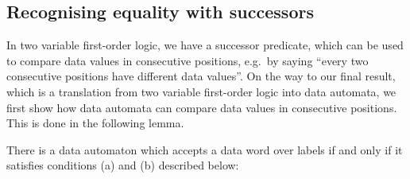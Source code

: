 \subsection*{Recognising equality with successors}
In two variable first-order logic, we have a successor predicate, which can be used to compare data values in consecutive positions, e.g.~by saying ``every two consecutive positions have different data values''. On the way to our final result, which is a translation from two variable first-order logic into data automata, we first show how data automata can compare data values in consecutive positions. This is done in the following lemma.
\begin{lemma}\label{lem:bjo-schwe}
	There is a data automaton which accepts a data word over labels
if and only if it satisfies conditions (a) and (b) described below:
 \end{lemma}
